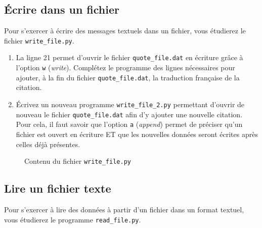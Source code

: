 
\subsection{Écrire dans un fichier}


Pour s'exercer à écrire des messages textuels dans un fichier, vous étudierez le fichier \texttt{write\_file.py}.

\begin{enumerate}

\item La ligne 21 permet d'ouvrir le fichier \texttt{quote\_file.dat} en écriture grâce
  à l'option \texttt{w} (\emph{write}).
  Complétez le programme des lignes nécessaires pour ajouter, à la fin du
  fichier \texttt{quote\_file.dat}, la traduction française de la citation.

\item   Écrivez   un  nouveau   programme   \texttt{write\_file\_2.py}
  permettant d'ouvrir  de nouveau le  fichier \texttt{quote\_file.dat}
  afin d'y ajouter une nouvelle citation. Pour cela, il faut savoir que l'option \texttt{a} (\emph{append}) permet
  de préciser qu'un fichier est ouvert en écriture ET que les nouvelles données seront écrites après celles déjà présentes. 

\end{enumerate}

\begin{figure}  
  
  \caption{Contenu du fichier \texttt{write\_file.py}}
  \label{stat_write_file}
\end{figure}

\subsection{Lire un fichier texte}


Pour  s'exercer à  lire des données à partir d'un  fichier dans un format textuel,
vous  étudierez le  programme \texttt{read\_file.py}.

